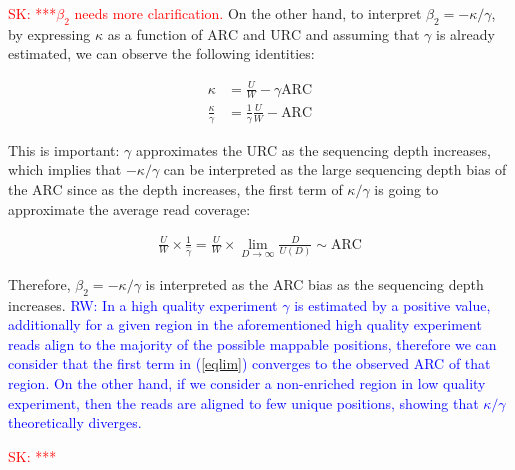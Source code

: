 \documentclass{bmcart}
\newcommand{\SK}[1]{\textcolor{red}{SK: #1}}
\newcommand{\RW}[1]{\textcolor{blue}{RW: #1}}
\begin{document}
\SK{***$\beta_2$ needs more clarification. } On the other hand, to
interpret $\beta_2 = - \kappa / \gamma $, by expressing $\kappa$ as a
function of $\mbox{ARC}$ and $\mbox{URC}$ and assuming that $\gamma$
is already estimated, we can observe the following identities:

\begin{align*}
  \kappa &= \frac{U}{W} - \gamma \mbox{ARC} \\
  \frac{\kappa}{\gamma} &= \frac{1}{\gamma} \frac{U}{W}   - \mbox{ARC} 
\end{align*}

This is important: $\gamma$ approximates the URC as the sequencing
depth increases, which implies that $- \kappa / \gamma$ can be
interpreted as the large sequencing depth bias of the ARC since as the
depth increases, the first term of $\kappa / \gamma$ is going to
approximate the average read coverage:

\begin{align}
  \frac{U}{W}\times \frac{1}{\hat{\gamma}}= \frac{U}{W} \times \lim_{D
    \rightarrow \infty} \frac{D}{U(D)} \sim \mbox{ARC}
\label{eqlim}
\end{align}

Therefore, $\beta_2 = - \kappa / \gamma$ is interpreted as the ARC
bias as the sequencing depth increases. \RW{In a high quality
  experiment $\gamma$ is estimated by a positive value, additionally
  for a given region in the aforementioned high quality experiment
  reads align to the majority of the possible mappable positions,
  therefore we can consider that the first term in (\ref{eqlim})
  converges to the observed ARC of that region. On the other hand, if
  we consider a non-enriched region in low quality experiment, then
  the reads are aligned to few unique positions, showing that $\kappa
  / \gamma$ theoretically diverges.}


 \SK{***}

\end{document}
